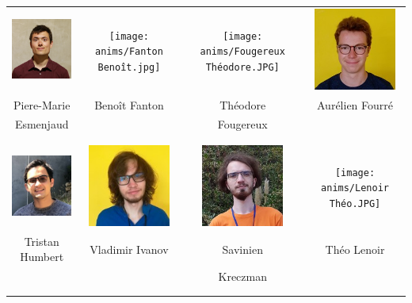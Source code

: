 \begin{center}
\begin{tabular}{cccc}
\includegraphics[angle=0,origin=c, width=27mm]{anims/Esmanjaud Pierre-Marie.JPG} &
\texttt{[image: anims/Fanton Benoît.jpg]} &
\texttt{[image: anims/Fougereux Théodore.JPG]} &
\includegraphics[angle=0,origin=c, width=27mm]{anims/Fourré Aurélien.jpg} \\
Piere-Marie & Benoît Fanton & Théodore & Aurélien Fourré \\ Esmenjaud & & Fougereux & \\ \\ \\ 

\includegraphics[angle=0,origin=c, width=27mm]{anims/Humbert Tristan.JPG} &
\includegraphics[angle=0,origin=c, width=27mm]{anims/Ivanov Vladimir.jpg} &
\includegraphics[angle=0,origin=c, width=27mm]{anims/Kreczman Savinien.jpg} &
\texttt{[image: anims/Lenoir Théo.JPG]} \\
Tristan Humbert & Vladimir Ivanov & Savinien & Théo Lenoir \\ & & Kreczman & \\ \\ \\ 

\end{tabular}
\end{center}
\pagebreak

